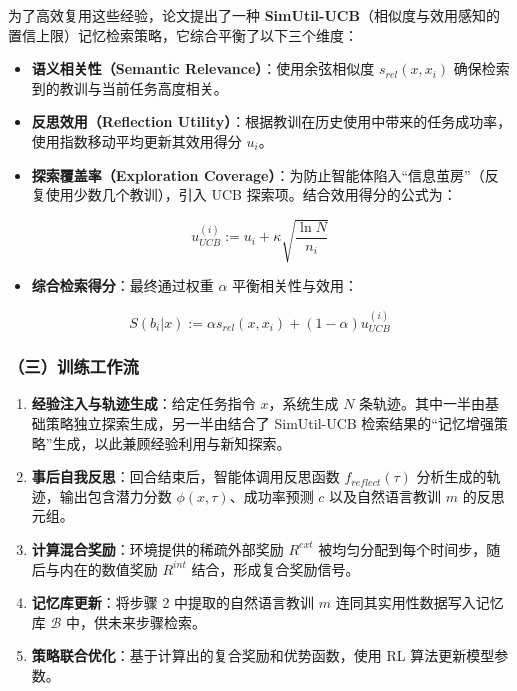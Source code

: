 为了高效复用这些经验，论文提出了一种 \textbf{SimUtil-UCB}（相似度与效用感知的置信上限）记忆检索策略，它综合平衡了以下三个维度：

\begin{itemize}
\tightlist
\item
  \textbf{语义相关性（Semantic Relevance）}：使用余弦相似度 \(s_{rel}(x,x_i)\) 确保检索到的教训与当前任务高度相关。
\item
  \textbf{反思效用（Reflection Utility）}：根据教训在历史使用中带来的任务成功率，使用指数移动平均更新其效用得分 \(u_i\)。
\item
  \textbf{探索覆盖率（Exploration Coverage）}：为防止智能体陷入``信息茧房''（反复使用少数几个教训），引入 UCB 探索项。结合效用得分的公式为：
\end{itemize}

\[
u_{UCB}^{(i)} := u_i + \kappa\sqrt{\frac{\ln N}{n_i}}
\]

\begin{itemize}
\tightlist
\item
  \textbf{综合检索得分}：最终通过权重 \(\alpha\) 平衡相关性与效用：
\end{itemize}

\[
S(b_i|x) := \alpha s_{rel}(x,x_i) + (1-\alpha)u_{UCB}^{(i)}
\]

\hypertarget{ux4e09ux8badux7ec3ux5de5ux4f5cux6d41-2}{%
\subsubsection{（三）训练工作流}\label{ux4e09ux8badux7ec3ux5de5ux4f5cux6d41-2}}

\begin{enumerate}
\def\labelenumi{\arabic{enumi}.}
\tightlist
\item
  \textbf{经验注入与轨迹生成}：给定任务指令 \(x\)，系统生成 \(N\) 条轨迹。其中一半由基础策略独立探索生成，另一半由结合了 SimUtil-UCB 检索结果的``记忆增强策略''生成，以此兼顾经验利用与新知探索。
\item
  \textbf{事后自我反思}：回合结束后，智能体调用反思函数 \(f_{reflect}(\tau)\) 分析生成的轨迹，输出包含潜力分数 \(\phi(x,\tau)\)、成功率预测 \(c\) 以及自然语言教训 \(m\) 的反思元组。
\item
  \textbf{计算混合奖励}：环境提供的稀疏外部奖励 \(R^{ext}\) 被均匀分配到每个时间步，随后与内在的数值奖励 \(R^{int}\) 结合，形成复合奖励信号。
\item
  \textbf{记忆库更新}：将步骤 2 中提取的自然语言教训 \(m\) 连同其实用性数据写入记忆库 \(\mathcal{B}\) 中，供未来步骤检索。
\item
  \textbf{策略联合优化}：基于计算出的复合奖励和优势函数，使用 RL 算法更新模型参数。
\end{enumerate}

